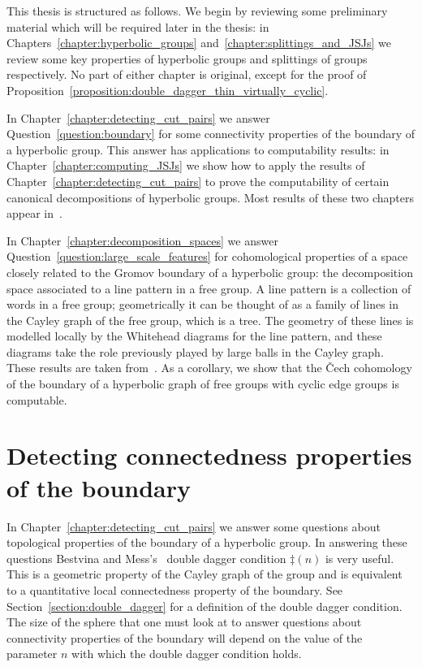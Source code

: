 This thesis is structured as follows.
We begin by reviewing some preliminary material which will be required later in the thesis: in Chapters~\ref{chapter:hyperbolic_groups} and~\ref{chapter:splittings_and_JSJs} we review some key properties of hyperbolic groups and splittings of groups respectively. 
No part of either chapter is original, except for the proof of Proposition~\ref{proposition:double_dagger_thin_virtually_cyclic}.

In Chapter~\ref{chapter:detecting_cut_pairs} we answer Question~\ref{question:boundary} for some connectivity properties of the boundary of a hyperbolic group.
This answer has applications to computability results: in Chapter~\ref{chapter:computing_JSJs} we show how to apply the results of Chapter~\ref{chapter:detecting_cut_pairs} to prove the computability of certain canonical decompositions of hyperbolic groups.  
Most results of these two chapters appear in~\cite{barrett18}.

In Chapter~\ref{chapter:decomposition_spaces} we answer Question~\ref{question:large_scale_features} for cohomological properties of a space closely related to the Gromov boundary of a hyperbolic group: the decomposition space associated to a line pattern in a free group. 
A line pattern is a collection of words in a free group; geometrically it can be thought of as a family of lines in the Cayley graph of the free group, which is a tree.
The geometry of these lines is modelled locally by the Whitehead diagrams for the line pattern, and these diagrams take the role previously played by large balls in the Cayley graph.
These results are taken from~\cite{barrett17}.
As a corollary, we show that the \v{C}ech cohomology of the boundary of a hyperbolic graph of free groups with cyclic edge groups is computable.

\section{Detecting connectedness properties of the boundary}

In Chapter~\ref{chapter:detecting_cut_pairs} we answer some questions about topological properties of the boundary of a hyperbolic group.
In answering these questions Bestvina and Mess's~\cite{bestvinamess91} double dagger condition $\ddag(n)$ is very useful.
This is a geometric property of the Cayley graph of the group and is equivalent to a quantitative local connectedness property of the boundary.
See Section~\ref{section:double_dagger} for a definition of the double dagger condition.
The size of the sphere that one must look at to answer questions about connectivity properties of the boundary will depend on the value of the parameter $n$ with which the double dagger condition holds.

